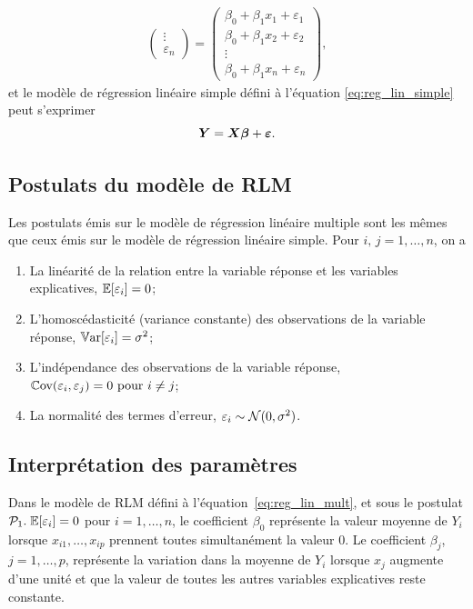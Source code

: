 \begin{exemple}
\begin{align*}
\begin{pmatrix}
        \vdots \\
        \varepsilon_n 
    \end{pmatrix}
    =
    \begin{pmatrix}
        \beta_0 + \beta_1 x_1 + \varepsilon_1 \\
        \beta_0 + \beta_1 x_2 + \varepsilon_2 \\
        \vdots \\
        \beta_0 + \beta_1 x_n + \varepsilon_n
    \end{pmatrix}, 
\end{align*}
et le modèle de régression linéaire simple défini à l'équation \eqref{eq:reg_lin_simple} peut s'exprimer 
\begin{equation*}
\bm{Y}=\bm{X}\bm\beta+\bm\varepsilon.
\end{equation*}
\end{exemple}

\subsection{Postulats du modèle de RLM}
\label{sec:PostulatsRLM}

Les postulats émis sur le modèle de régression linéaire multiple sont les mêmes que ceux émis sur le modèle de régression linéaire simple. Pour $i, \, j=1, \dots, n$, on a
\begin{enumerate}
  \item[$\mathcal{P}_1$.] La linéarité de la relation entre la variable réponse et les variables explicatives, $\mathbb{E}[\varepsilon_i]=0$;
 \item[$\mathcal{P}_2$.] L'homoscédasticité (variance constante) des observations de la variable réponse, $\mathbb{V}\text{ar}[\varepsilon_i]=\sigma^2$;
 \item[$\mathcal{P}_3$.] L'indépendance des observations de la variable réponse, $\mathbb{C}\text{ov}(\varepsilon_i,\varepsilon_j)=0 \mbox{ pour } i \neq j$;
 \item[$\mathcal{P}_4$.] La normalité des termes d'erreur, $\varepsilon_i \sim \mathcal{N}(0,\sigma^2)$.
\end{enumerate}


\subsection{Interprétation des paramètres}
\label{sec:InterpétationRLM}

Dans le modèle de RLM  défini à l'équation~\eqref{eq:reg_lin_mult}, et sous le postulat $\mathcal{P}_1. \; \mathbb{E}[\varepsilon_i]=0$ pour $i=1, \dots, n$, le coefficient $\beta_0$ représente la valeur moyenne de $Y_i$ lorsque $x_{i1}, \ldots, x_{ip}$ prennent toutes simultanément la valeur 0. Le coefficient $\beta_j$, $j=1, \dots, p$, représente la variation dans la moyenne de $Y_i$ lorsque $x_j$ augmente d'une unité et que la valeur de toutes les autres variables explicatives reste constante.

